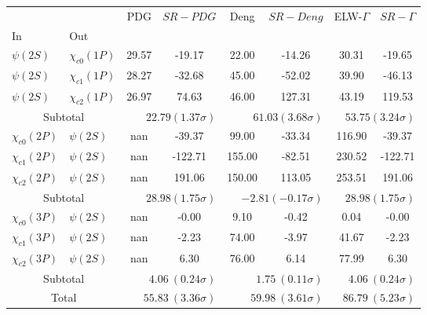 \begin{tabular}{|l|l|c|c|c|c|c|c|}%
\hline%
&&PDG&$SR-PDG$&Deng&$SR-Deng$&ELW-$\Gamma$&$SR-\Gamma$\\%
In&Out&&&&&&\\%
\hline%
$\psi(2S)$&$\chi_{c0}(1P)$&29.57&-19.17&22.00&-14.26&30.31&-19.65\\%
$\psi(2S)$&$\chi_{c1}(1P)$&28.27&-32.68&45.00&-52.02&39.90&-46.13\\%
$\psi(2S)$&$\chi_{c2}(1P)$&26.97&74.63&46.00&127.31&43.19&119.53\\%
\hline%
\hline%
\multicolumn{2}{|c|}{Subtotal}&\multicolumn{2}{|r|}{$22.79 (1.37\sigma)$}&\multicolumn{2}{|r|}{$61.03 (3.68\sigma)$}&\multicolumn{2}{|r|}{$53.75 (3.24\sigma)$}\\%
\hline%
\hline%
$\chi_{c0}(2P)$&$\psi(2S)$&nan&-39.37&99.00&-33.34&116.90&-39.37\\%
$\chi_{c1}(2P)$&$\psi(2S)$&nan&-122.71&155.00&-82.51&230.52&-122.71\\%
$\chi_{c2}(2P)$&$\psi(2S)$&nan&191.06&150.00&113.05&253.51&191.06\\%
\hline%
\hline%
\multicolumn{2}{|c|}{Subtotal}&\multicolumn{2}{|r|}{$28.98 (1.75\sigma)$}&\multicolumn{2}{|r|}{$-2.81 (-0.17\sigma)$}&\multicolumn{2}{|r|}{$28.98 (1.75\sigma)$}\\%
\hline%
\hline%
$\chi_{c0}(3P)$&$\psi(2S)$&nan&-0.00&9.10&-0.42&0.04&-0.00\\%
$\chi_{c1}(3P)$&$\psi(2S)$&nan&-2.23&74.00&-3.97&41.67&-2.23\\%
$\chi_{c2}(3P)$&$\psi(2S)$&nan&6.30&76.00&6.14&77.99&6.30\\%
\hline%
\hline%
\multicolumn{2}{|c|}{Subtotal}&\multicolumn{2}{|r|}{$4.06~(0.24\sigma)$}&\multicolumn{2}{|r|}{$1.75~(0.11\sigma)$}&\multicolumn{2}{|r|}{$4.06~(0.24\sigma)$}\\%
\hline%
\hline%
\multicolumn{2}{|c|}{Total}&\multicolumn{2}{|r|}{$55.83~(3.36\sigma)$}&\multicolumn{2}{|r|}{$59.98~(3.61\sigma)$}&\multicolumn{2}{|r|}{$86.79~(5.23\sigma)$}\\%
\hline%
\end{tabular}